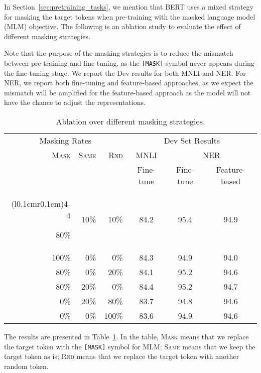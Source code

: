 \documentclass[11pt,a4paper]{article}
\begin{document}
In Section~\ref{sec:pretraining_tasks}, we mention that BERT uses a mixed strategy for masking the target tokens when pre-training with the masked language
model (MLM) objective. The following is an ablation study to evaluate the effect of different masking strategies.

Note that the purpose of the masking strategies is to reduce the mismatch
between pre-training and fine-tuning, as the {\tt [MASK]} symbol never appears during the fine-tuning stage. We report the Dev results for both
MNLI and NER. For NER, we report both fine-tuning and feature-based approaches,
as we expect the mismatch will be amplified for the feature-based approach as
the model will not have the chance to adjust the representations.

\begin{table}[ht]
\begin{center}
{\small
\begin{tabular}{@{}rrrccc@{}}
  \toprule
  \multicolumn{3}{c}{Masking Rates} & \multicolumn{3}{c}{Dev Set Results} \\
  \cmidrule(r{0.2cm}){1-3}
  \cmidrule(l{0.2cm}){4-6}
  \textsc{Mask} &	\textsc{Same}&	\textsc{Rnd}	& {MNLI} &	\multicolumn{2}{c}{NER}\\
   &  & & {\footnotesize Fine-tune} &   {\footnotesize Fine-tune}	& {\footnotesize Feature-based}\\
    \cmidrule(r{0.2cm}){1-3}
  \cmidrule(l{0.1cm}r{0.1cm}){4-4}
  \cmidrule(l{0.2cm}){5-6}
  
  80\%	&10\%	&10\%	&84.2	&95.4	&94.9\\
100\%	&0\%	&0\%	&84.3	&94.9	&94.0\\
80\%	&0\%	&20\%	&84.1	&95.2	&94.6\\
80\%	&20\%	&0\%	&84.4	&95.2	&94.7\\
0\%	&20\%	&80\%	&83.7	&94.8	&94.6 \\
0\%	&0\%	&100\%	&83.6	&94.9	&94.6\\
\bottomrule
\end{tabular}
} \end{center}
\caption{\label{tab:mask_ablation} Ablation over different masking strategies.}
\end{table}

 
The results are presented in Table~\ref{tab:mask_ablation}. In the table,
 \textsc{Mask} means that we replace the target token with the {\tt [MASK]} symbol
for MLM; \textsc{Same} means that we keep the target token as is; \textsc{Rnd}
means that we replace the target token with another random token. 
\end{document}
